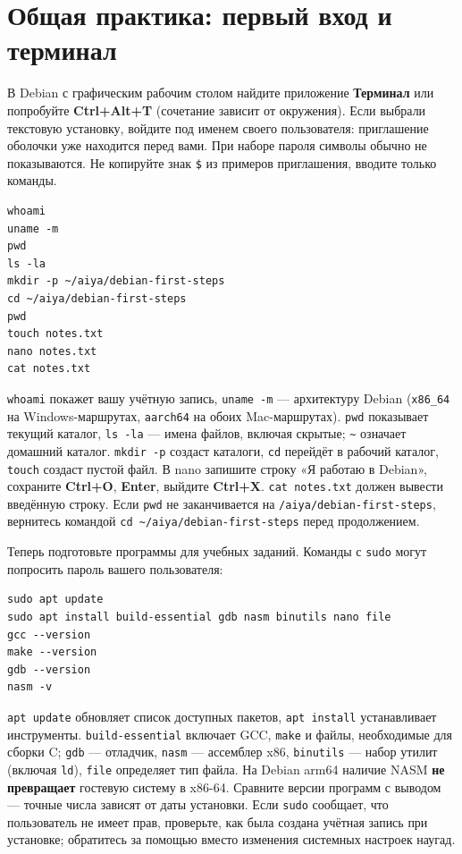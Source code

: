 \hypertarget{ux43eux431ux449ux430ux44f-ux43fux440ux430ux43aux442ux438ux43aux430-ux43fux435ux440ux432ux44bux439-ux432ux445ux43eux434-ux438-ux442ux435ux440ux43cux438ux43dux430ux43b}{%
\section{Общая практика: первый вход и
терминал}\label{ux43eux431ux449ux430ux44f-ux43fux440ux430ux43aux442ux438ux43aux430-ux43fux435ux440ux432ux44bux439-ux432ux445ux43eux434-ux438-ux442ux435ux440ux43cux438ux43dux430ux43b}}

В Debian с графическим рабочим столом найдите приложение
\textbf{Терминал} или попробуйте \textbf{Ctrl+Alt+T} (сочетание зависит
от окружения). Если выбрали текстовую установку, войдите под именем
своего пользователя: приглашение оболочки уже находится перед вами. При
наборе пароля символы обычно не показываются. Не копируйте знак
\texttt{\$} из примеров приглашения, вводите только команды.

\begin{verbatim}
whoami
uname -m
pwd
ls -la
mkdir -p ~/aiya/debian-first-steps
cd ~/aiya/debian-first-steps
pwd
touch notes.txt
nano notes.txt
cat notes.txt
\end{verbatim}

\texttt{whoami} покажет вашу учётную запись, \texttt{uname\ -m} ---
архитектуру Debian (\texttt{x86\_64} на Windows-маршрутах,
\texttt{aarch64} на обоих Mac-маршрутах). \texttt{pwd} показывает
текущий каталог, \texttt{ls\ -la} --- имена файлов, включая скрытые;
\texttt{\textasciitilde{}} означает домашний каталог. \texttt{mkdir\ -p}
создаст каталоги, \texttt{cd} перейдёт в рабочий каталог, \texttt{touch}
создаст пустой файл. В nano запишите строку «Я работаю в Debian»,
сохраните \textbf{Ctrl+O}, \textbf{Enter}, выйдите \textbf{Ctrl+X}.
\texttt{cat\ notes.txt} должен вывести введённую строку. Если
\texttt{pwd} не заканчивается на \texttt{/aiya/debian-first-steps},
вернитесь командой
\texttt{cd\ \textasciitilde{}/aiya/debian-first-steps} перед
продолжением.

Теперь подготовьте программы для учебных заданий. Команды с
\texttt{sudo} могут попросить пароль вашего пользователя:

\begin{verbatim}
sudo apt update
sudo apt install build-essential gdb nasm binutils nano file
gcc --version
make --version
gdb --version
nasm -v
\end{verbatim}

\texttt{apt\ update} обновляет список доступных пакетов,
\texttt{apt\ install} устанавливает инструменты.
\texttt{build-essential} включает GCC, \texttt{make} и файлы,
необходимые для сборки C; \texttt{gdb} --- отладчик, \texttt{nasm} ---
ассемблер x86, \texttt{binutils} --- набор утилит (включая \texttt{ld}),
\texttt{file} определяет тип файла. На Debian arm64 наличие NASM
\textbf{не превращает} гостевую систему в x86-64. Сравните версии
программ с выводом --- точные числа зависят от даты установки. Если
\texttt{sudo} сообщает, что пользователь не имеет прав, проверьте, как
была создана учётная запись при установке; обратитесь за помощью вместо
изменения системных настроек наугад.

